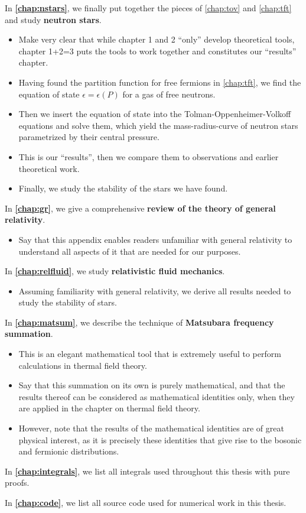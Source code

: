 In \textbf{\cref{chap:nstars}}, we finally put together the pieces of \cref{chap:tov} and \cref{chap:tft} and study \textbf{neutron stars}.
\begin{itemize}
\item Make very clear that while chapter 1 and 2 ``only'' develop theoretical tools, chapter 1+2=3 puts the tools to work together and constitutes our ``results'' chapter.
\item Having found the partition function for free fermions in \cref{chap:tft}, we find the equation of state $\epsilon = \epsilon(P)$ for a gas of free neutrons.
\item Then we insert the equation of state into the Tolman-Oppenheimer-Volkoff equations and solve them, which yield the mass-radius-curve of neutron stars parametrized by their central pressure.
\item This is our ``results'', then we compare them to observations and earlier theoretical work.
\item Finally, we study the stability of the stars we have found.
\end{itemize}

In \textbf{\cref{chap:gr}}, we give a comprehensive \textbf{review of the theory of general relativity}.
\begin{itemize}
\item Say that this appendix enables readers unfamiliar with general relativity to understand all aspects of it that are needed for our purposes.
\end{itemize}

In \textbf{\cref{chap:relfluid}}, we study \textbf{relativistic fluid mechanics}.
\begin{itemize}
\item Assuming familiarity with general relativity, we derive all results needed to study the stability of stars.
\end{itemize}

In \textbf{\cref{chap:matsum}}, we describe the technique of \textbf{Matsubara frequency summation}.
\begin{itemize}
\item This is an elegant mathematical tool that is extremely useful to perform calculations in thermal field theory.
\item Say that this summation on its own is purely mathematical, and that the results thereof can be considered as mathematical identities only, when they are applied in the chapter on thermal field theory.
\item However, note that the results of the mathematical identities are of great physical interest, as it is precisely these identities that give rise to the bosonic and fermionic distributions.
\end{itemize}

In \textbf{\cref{chap:integrals}}, we list all integrals used throughout this thesis with pure proofs.

In \textbf{\cref{chap:code}}, we list all source code used for numerical work in this thesis.

